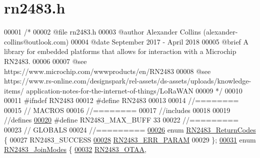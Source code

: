 \hypertarget{rn2483_8h_source}{}\section{rn2483.\+h}
\label{rn2483_8h_source}

\begin{DoxyCode}
00001 \textcolor{comment}{/*}
00002 \textcolor{comment}{    @file   rn2483.h}
00003 \textcolor{comment}{    @author Alexander Collins (alexander-collins@outlook.com)}
00004 \textcolor{comment}{    @date   September 2017 - April 2018}
00005 \textcolor{comment}{    @brief  A library for embedded platforms that allows for interaction with a Microchip RN2483.}
00006 \textcolor{comment}{}
00007 \textcolor{comment}{    @see https://www.microchip.com/wwwproducts/en/RN2483}
00008 \textcolor{comment}{    @see https://www.rs-online.com/designspark/rel-assets/ds-assets/uploads/knowledge-items/
      application-notes-for-the-internet-of-things/LoRaWAN%
00009 \textcolor{comment}{*/}
00010 
00011 \textcolor{preprocessor}{#ifndef RN2483}
00012 \textcolor{preprocessor}{#define RN2483}
00013 
00014 \textcolor{comment}{//========}
00015 \textcolor{comment}{// MACROS}
00016 \textcolor{comment}{//========}
00017 \textcolor{comment}{//includes}
00018 
00019 \textcolor{comment}{//defines}
\hyperlink{rn2483_8h_a4ba22651381954553c4ecaf79d32efa8}{00020} \textcolor{preprocessor}{#define RN2483\_MAX\_BUFF 33 }
00022 \textcolor{preprocessor}{//=========}
00023 \textcolor{comment}{// GLOBALS}
00024 \textcolor{comment}{//=========}
\hyperlink{rn2483_8h_a7343337746d25c0cdcd82c8df0413b78}{00026} \textcolor{comment}{}\textcolor{keyword}{enum} \hyperlink{rn2483_8h_a7343337746d25c0cdcd82c8df0413b78}{RN2483\_ReturnCodes} \{
00027     RN2483\_SUCCESS      
\hyperlink{rn2483_8h_a7343337746d25c0cdcd82c8df0413b78ad1b0df589d3f2198658fbcf4e314f995}{00028}     \hyperlink{rn2483_8h_a7343337746d25c0cdcd82c8df0413b78ad1b0df589d3f2198658fbcf4e314f995}{RN2483\_ERR\_PARAM}    
00029 \};
\hyperlink{rn2483_8h_a3b5645bbe6fb977c0cc8eb1d3670e5f0}{00031} \textcolor{keyword}{enum} \hyperlink{rn2483_8h_a3b5645bbe6fb977c0cc8eb1d3670e5f0}{RN2483\_JoinModes} \{
\hyperlink{rn2483_8h_a3b5645bbe6fb977c0cc8eb1d3670e5f0a9007020363e652f0ebc6afd40238b888}{00032}     \hyperlink{rn2483_8h_a3b5645bbe6fb977c0cc8eb1d3670e5f0a9007020363e652f0ebc6afd40238b888}{RN2483\_OTAA}, 
}
\end{DoxyCode}
